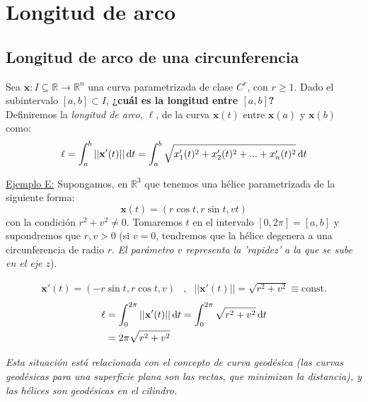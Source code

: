 \section{Longitud de arco}

\subsection{Longitud de arco de una circunferencia}

Sea $\mathbf{x}:I\subseteq \mathbb{R}\longrightarrow \mathbb{R}^n$ una curva parametrizada de clase $C^r$, con $r\ge 1$. Dado el subintervalo $[a,b]\subset I$, \textbf{¿cuál es la longitud entre $[a,b]$?}\\

Definiremos la \emph{longitud de arco}, $\ell$, de la curva $\mathbf{x}(t)$ entre $\mathbf{x}(a)$ y $\mathbf{x}(b)$ como:
$$
\ell =\int_a^b ||\mathbf{x'}(t)|| \odif[order=1]{t}=\int _a^b\sqrt{x_1'(t)^2+x_2'(t)^2+...+x_n'(t)^2}\odif[order=1]{t}
$$

\begin{mybox}
    \underline{Ejemplo E:} Supongamos, en $\mathbb{R}^3$ que tenemos una hélice parametrizada de la siguiente forma:
    $$
    \mathbf{x}(t)=(r\cos{t},r\sin{t},vt)
    $$
    con la condición $r^2+v^2\neq 0$. Tomaremos $t$ en el intervalo $[0,2\pi]=[a,b]$ y supondremos que $r,v>0$ (si $v=0$, tendremos que la hélice degenera a una circunferencia de radio $r$. \emph{ El parámetro $v$ representa la 'rapidez' a la que se sube en el eje $z$}).

    \begin{align*}
        \mathbf{x'}(t)=(-r\sin{t},r\cos{t},v)& , &||\mathbf{x'}(t)||=\sqrt{r^2+v^2}\equiv \text{const.}
    \end{align*}
    \begin{equation*}
        \begin{split}
        \ell &=\int_0^{2\pi} ||\mathbf{x'}(t)||\odif[order=1]{t}=\int_0^{2\pi} \sqrt{r^2+v^2}\odif[order=1]{t}\\
        &=2\pi \sqrt{r^2+v^2}
    \end{split}
    \end{equation*}

    \emph{Esta situación está relacionada con el concepto de curva geodésica (las curvas geodésicas para una superficie plana son las rectas, que minimizan la distancia), y las hélices son geodésicas en el cilindro.}

\end{mybox}

